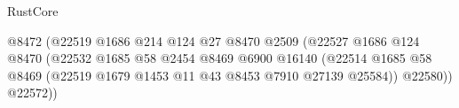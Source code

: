 \begin{lexlean}{RustCore}
\begin{coremodule}
                                                                  @8472
                                                                  (@22519
                                                                    @1686
                                                                    @214
                                                                    @124
                                                                    @27
                                                                    @8470
                                                                    @2509
                                                                    (@22527
                                                                      @1686
                                                                      @124
                                                                      @8470
                                                                      (@22532
                                                                        @1685
                                                                        @58
                                                                        @2454
                                                                        @8469
                                                                        @6900
                                                                        @16140
                                                                        (@22514
                                                                          @1685
                                                                          @58
                                                                          @8469
                                                                          (@22519
                                                                            @1679
                                                                            @1453
                                                                            @11
                                                                            @43
                                                                            @8453
                                                                            @7910
                                                                            @27139
                                                                            @25584))
                                                                        @22580))
                                                                    @22572))

\end{coremodule}
\end{lexlean}
